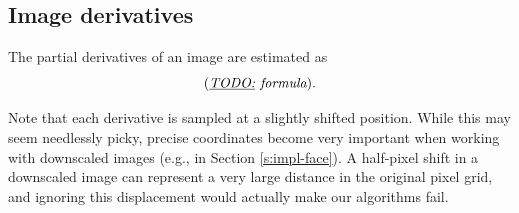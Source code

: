\subsection{Image derivatives}
The partial derivatives of an image are estimated as
$$(\textit{\underline{TODO:} formula}).$$

Note that each derivative is sampled at a slightly shifted position.
While this may seem needlessly picky, precise coordinates become very important when working with downscaled images (e.g., in Section \ref{s:impl-face}).
A half-pixel shift in a downscaled image can represent a very large distance in the original pixel grid, and ignoring this displacement would actually make our algorithms fail.
